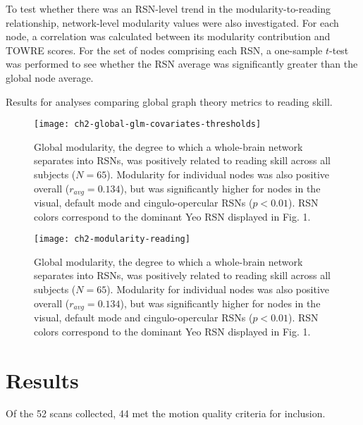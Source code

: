 To test whether there was an RSN-level trend in the modularity-to-reading relationship, network-level modularity values were also investigated. For each node, a correlation was calculated between its modularity contribution and TOWRE scores. For the set of nodes comprising each RSN, a one-sample $t$-test was performed to see whether the RSN average was significantly greater than the global node average. 

\begin{table}
	\renewcommand{\tabcolsep}{0.09cm}
	\centering
	
	\caption{Results for analyses comparing global graph theory metrics to reading skill.}
	\label{table:ch2-global-glm-results}
\end{table}

\begin{figure}[t]
    \centering
    \texttt{[image: ch2-global-glm-covariates-thresholds]}
    \caption[Modularity metrics at rest are the best predictors of cognitive skills.] {Global modularity, the degree to which a whole-brain network separates into RSNs, was positively related to reading skill across all subjects ($N = 65$). Modularity for individual nodes was also positive overall ($r_{avg} = 0.134$), but was significantly higher for nodes in the visual, default mode and cingulo-opercular RSNs ($p < 0.01$). RSN colors correspond to the dominant Yeo RSN displayed in Fig. 1.}
    \label{fig:ch2-global-glm-covariates-thresh}
\end{figure}

\begin{figure}[t]
    \centering
    \texttt{[image: ch2-modularity-reading]}
    \caption[Modularity metrics at rest predict reading skill.] {Global modularity, the degree to which a whole-brain network separates into RSNs, was positively related to reading skill across all subjects ($N = 65$). Modularity for individual nodes was also positive overall ($r_{avg} = 0.134$), but was significantly higher for nodes in the visual, default mode and cingulo-opercular RSNs ($p < 0.01$). RSN colors correspond to the dominant Yeo RSN displayed in Fig. 1.}
    \label{fig:ch2-modularity-reading}
\end{figure}

\section{Results} 

Of the 52 scans collected, 44 met the motion quality criteria for inclusion. 

